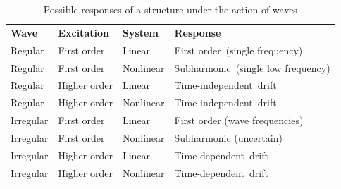 \begin{table}
\centering
\begin{tabular}{|l|l|l|l|} 
\hline
\textbf{Wave}      & \textbf{Excitation}   & \textbf{System}    & \textbf{Response}                            \\ 
\hhline{|====|}
Regular   & First order  & Linear    & First order~(single frequency)      \\ 
\hline
Regular   & First order  & Nonlinear & Subharmonic~(single low frequency)  \\ 
\hline
Regular   & Higher order & Linear    & Time-independent~drift              \\ 
\hline
Regular   & Higher order & Nonlinear & Time-independent~drift              \\ 
\hline
Irregular & First order  & Linear    & First order (wave frequencies)      \\ 
\hline
Irregular & First order  & Nonlinear & Subharmonic (uncertain)             \\ 
\hline
Irregular & Higher order & Linear    & Time-dependent~drift                \\ 
\hline
Irregular & Higher order & Nonlinear & Time-dependent~drift                \\
\hline
\end{tabular}
\caption{Possible responses of a structure under the action of waves \parencite{journee2000offshore}}
\end{table} 










